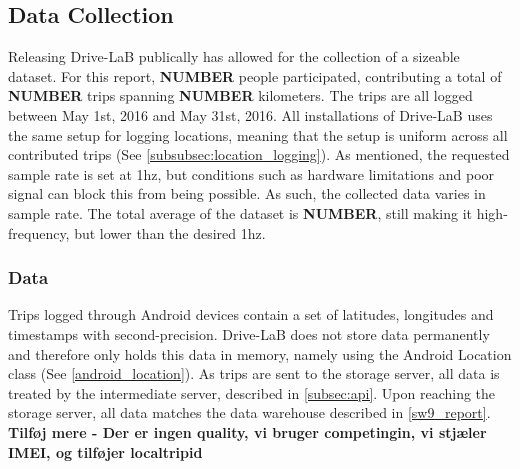 \subsection{Data Collection}\label{sec:datacollection}
Releasing Drive-LaB publically has allowed for the collection of a sizeable dataset. For this report, \textbf{NUMBER} people participated, contributing a total of \textbf{NUMBER} trips spanning \textbf{NUMBER} kilometers. The trips are all logged between May 1st, 2016 and May 31st, 2016. All installations of Drive-LaB uses the same setup for logging locations, meaning that the setup is uniform across all contributed trips (See \ref{subsubsec:location_logging}). As mentioned, the requested sample rate is set at 1hz, but conditions such as hardware limitations and poor signal can block this from being possible. As such, the collected data varies in sample rate. The total average of the dataset is \textbf{NUMBER}, still making it high-frequency, but lower than the desired 1hz.

\subsubsection{Data}\label{subsec:data}
Trips logged through Android devices contain a set of latitudes, longitudes and timestamps with second-precision. Drive-LaB does not store data permanently and therefore only holds this data in memory, namely using the Android Location class (See \ref{android_location}). As trips are sent to the storage server, all data is treated by the intermediate server, described in \ref{subsec:api}. Upon reaching the storage server, all data matches the data warehouse described in \ref{sw9_report}. \textbf{Tilføj mere - Der er ingen quality, vi bruger competingin, vi stjæler IMEI, og tilføjer localtripid} 